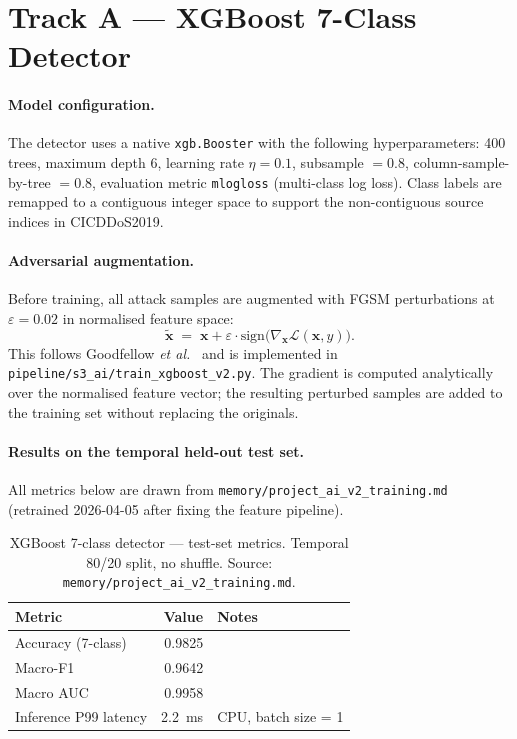 \section{Track A --- XGBoost 7-Class Detector}
\label{sec:xgb}

\paragraph{Model configuration.}
The detector uses a native \texttt{xgb.Booster} with the following
hyperparameters: 400 trees, maximum depth 6, learning rate
$\eta = 0.1$, subsample $= 0.8$, column-sample-by-tree $= 0.8$,
evaluation metric \texttt{mlogloss} (multi-class log loss). Class
labels are remapped to a contiguous integer space to support the
non-contiguous source indices in CICDDoS2019.

\paragraph{Adversarial augmentation.}
Before training, all attack samples are augmented with FGSM
perturbations at $\varepsilon = 0.02$ in normalised feature space:
\[
  \tilde{\mathbf{x}} \;=\; \mathbf{x}
    + \varepsilon \cdot \text{sign}\!\bigl(
      \nabla_{\mathbf{x}} \mathcal{L}(\mathbf{x}, y)
    \bigr).
\]
This follows Goodfellow \textit{et al.}~\citep{goodfellow2015fgsm} and
is implemented in \texttt{pipeline/s3\_ai/train\_xgboost\_v2.py}. The
gradient is computed analytically over the normalised feature vector;
the resulting perturbed samples are added to the training set without
replacing the originals.

\paragraph{Results on the temporal held-out test set.}
All metrics below are drawn from
\texttt{memory/project\_ai\_v2\_training.md} (retrained 2026-04-05
after fixing the feature pipeline).

\begin{table}[H]
\centering
\small
\caption{XGBoost 7-class detector --- test-set metrics.
Temporal 80/20 split, no shuffle.
Source: \texttt{memory/project\_ai\_v2\_training.md}.}
\label{tab:xgb-metrics}
\begin{tabular}{@{}lrl@{}}
\toprule
Metric & Value & Notes \\
\midrule
Accuracy (7-class)    & 0.9825 & \\
Macro-F1              & 0.9642 & \\
Macro AUC             & 0.9958 & \\
Inference P99 latency & 2.2~ms & CPU, batch size = 1 \\
\bottomrule
\end{tabular}
\end{table}

